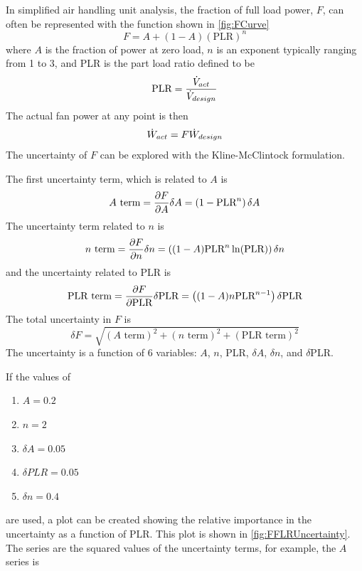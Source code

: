 In simplified air handling unit analysis, the fraction of full load
power, \(F\), can often be represented with the function shown in
\figref{} \ref{fig:FCurve}
\begin{equation}
    F = A + (1-A)( \text{PLR} )^{n}
\end{equation}
where \(A\) is the fraction of power at zero load, \(n\) is an exponent
typically ranging from 1 to 3, and PLR is the part load
ratio defined to be
\begin{equation}
    \text{PLR} = \frac{\dot{V}_{act}}{\dot{V}_{design}}
\end{equation}
The actual fan power at any point is then
\begin{equation}
    \dot{W}_{act}  = F \dot{W}_{design}
\end{equation}
The uncertainty of \(F\) can be explored with the Kline-McClintock
formulation.

The first uncertainty term, which is related to \(A\) is
\begin{equation}
A \text{ term} = \pdv{F}{A} \delta A = \left(1-\text{PLR}^n\right) \delta A
\end{equation}
The uncertainty term related to \(n\) is
\begin{equation}
    n \text{ term} = \pdv{F}{n} \delta n = \left((1-A) \text{PLR}^n \ln (\text{PLR})\right) \delta n
\end{equation}
and the uncertainty related to PLR is
\begin{equation}
    \text{PLR term} = \pdv{F}{ \text{PLR}} \delta \text{PLR} = \left((1-A) n \text{PLR}^{n-1}\right) \delta \text{PLR}
\end{equation}
The total uncertainty in \(F\) is
\begin{equation}
    \delta F = \sqrt{ \left(A \text{ term}\right)^{2} + \left(n \text{ term}\right)^{2} + \left( \text{PLR term}\right)^{2} }
\end{equation}
The uncertainty is a function of 6 variables: \(A\), \(n\), PLR, \(\delta A\), \(\delta n\), and \(\delta\)PLR.

If the values of
\begin{enumerate}
    \item \(A=0.2\)
    \item \(n=2\)
    \item \(\delta A = 0.05\)
    \item \(\delta PLR = 0.05\)
    \item \(\delta n = 0.4\)
\end{enumerate}
are used, a plot can be created showing the relative importance in the
uncertainty as a function of PLR. This plot is shown in \figref{}
\ref{fig:FFLRUncertainty}. The series are the squared values of the
uncertainty terms, for example, the \(A\) series is 


